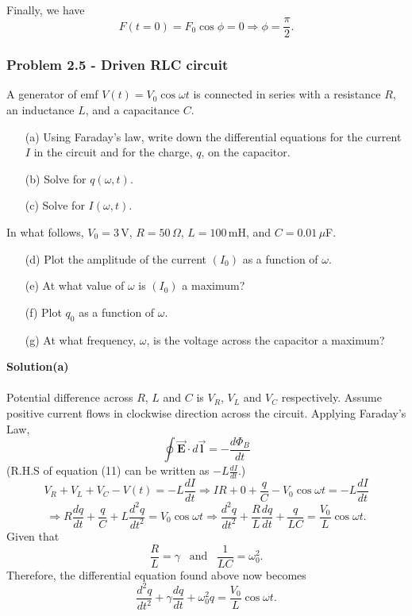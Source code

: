 \documentclass[12pt,a4paper]{article}
\begin{document}
\\Finally, we have
\[F(t=0)=F_0\cos\phi=0\Rightarrow\phi=\frac{\pi}{2}.\]
\subsubsection*{Problem 2.5 - Driven RLC circuit}
A generator of emf $V(t)=V_0\cos\omega t$ is connected in series with a resistance $R$, an inductance $L$, and a capacitance $C$.
\begin{enumerate}
    \item[(a)]Using Faraday’s law, write down the differential equations for the current $I$ in the circuit and for the charge, $q$, on the capacitor.
    \item[(b)]Solve for $q(\omega,t)$.
    \item[(c)]Solve for $I(\omega,t)$.
\end{enumerate}
In what follows, $V_0=3\,$V, $R=50\,\Omega$, $L=100$\,mH, and $C=0.01\,\mu$F.
\begin{enumerate}
    \item[(d)]Plot the amplitude of the current $(I_0)$ as a function of $\omega$.
    \item[(e)]At what value of $\omega$ is $(I_0)$ a maximum?
    \item[(f)]Plot $q_0$ as a function of $\omega$.
    \item[(g)]At what frequency, $\omega$, is the voltage across the capacitor a maximum?
\end{enumerate}
\textbf{Solution(a)}
\\
\\Potential difference across $R$, $L$ and $C$ is $V_R$, $V_L$ and $V_C$ respectively. Assume positive current flows in clockwise direction across the circuit. Applying Faraday's Law,
\begin{equation}
    \oint\boldsymbol{\Vec{E}}\cdot d\boldsymbol{\Vec{l}}=-\frac{d\Phi_B}{dt}
\end{equation}
(R.H.S of equation (11) can be written as $-L\frac{dI}{dt}$.)
\[V_R+V_L+V_C-V(t)=-L\frac{dI}{dt}\Rightarrow IR+0+\frac{q}{C}-V_0\cos\omega t=-L\frac{dI}{dt}\]
\[\Rightarrow R\frac{dq}{dt}+\frac{q}{C}+L\frac{d^2q}{dt^2}=V_0\cos\omega t\Rightarrow \frac{d^2q}{dt^2}+\frac{R}{L}\frac{dq}{dt}+\frac{q}{LC}=\frac{V_0}{L}\cos\omega t.\]
Given that
\[\frac{R}{L}=\gamma\,\,\,\,\,\text{and}\,\,\,\,\,\frac{1}{LC}=\omega_0^2.\]
Therefore, the differential equation found above now becomes
\begin{equation}
    \frac{d^2q}{dt^2}+\gamma\frac{dq}{dt}+\omega_0^2q=\frac{V_0}{L}\cos\omega t.
\end{equation}
\end{document}
